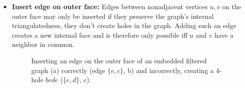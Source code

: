 \begin{itemize}
	\item \textbf{Insert edge on outer face:} Edges between nonadjacent vertices $u, v$ on the outer face may only be inserted if they preserve the graph's internal triangulatedness, \ie{} they don't create holes in the graph. Adding such an edge creates a new internal face and is therefore only possible iff $u$ and $v$ have a neighbor in common.
\begin{figure}[H]
	\centering
	\quad
	\quad
	\caption{Inserting an edge on the outer face of an embedded filtered graph (a) correctly (edge $\{e,c\}$, b) and incorrectly, creating a 4-hole $bcde$ ($\{e,d\}$, c).}
	\label{fig:transformation}
\end{figure}


\end{itemize}
